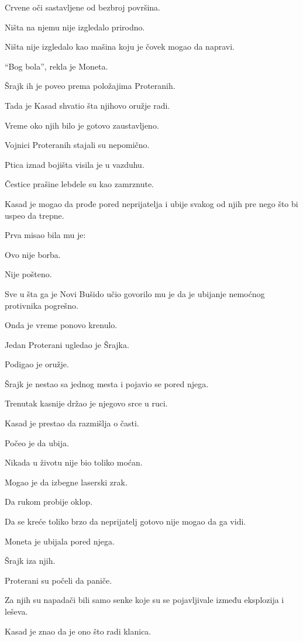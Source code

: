 Crvene oči sastavljene od bezbroj površina.

Ništa na njemu nije izgledalo prirodno.

Ništa nije izgledalo kao mašina koju je čovek mogao da napravi.

``Bog bola'', rekla je Moneta.

Šrajk ih je poveo prema položajima Proteranih.

Tada je Kasad shvatio šta njihovo oružje radi.

Vreme oko njih bilo je gotovo zaustavljeno.

Vojnici Proteranih stajali su nepomično.

Ptica iznad bojišta visila je u vazduhu.

Čestice prašine lebdele su kao zamrznute.

Kasad je mogao da prođe pored neprijatelja i ubije svakog od njih pre nego što bi uspeo da trepne.

Prva misao bila mu je:

Ovo nije borba.

Nije pošteno.

Sve u šta ga je Novi Bušido učio govorilo mu je da je ubijanje nemoćnog protivnika pogrešno.

Onda je vreme ponovo krenulo.

Jedan Proterani ugledao je Šrajka.

Podigao je oružje.

Šrajk je nestao sa jednog mesta i pojavio se pored njega.

Trenutak kasnije držao je njegovo srce u ruci.

Kasad je prestao da razmišlja o časti.

Počeo je da ubija.

\bigskip

Nikada u životu nije bio toliko moćan.

Mogao je da izbegne laserski zrak.

Da rukom probije oklop.

Da se kreće toliko brzo da neprijatelj gotovo nije mogao da ga vidi.

Moneta je ubijala pored njega.

Šrajk iza njih.

Proterani su počeli da paniče.

Za njih su napadači bili samo senke koje su se pojavljivale između eksplozija i leševa.

Kasad je znao da je ono što radi klanica.

